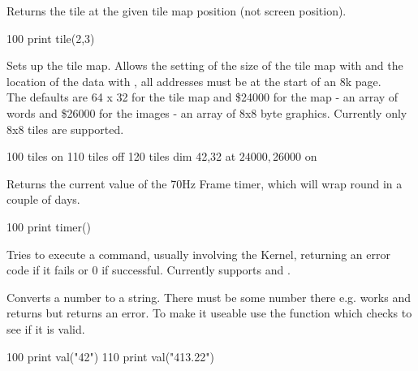 \begin{entry}
Returns the tile at the given tile map position (not screen position).

\begin{lstexample}
100 print tile(2,3)
\end{lstexample}
\end{entry}

\begin{entry}
Sets up the tile map. Allows the setting of the size of the tile map with  and the location of the data with , all addresses must be at the start of an 8k page.\\

The defaults are 64 x 32 for the tile map and \$24000 for the map - an array of words and \$26000 for the images - an array of 8x8 byte graphics. Currently only 8x8 tiles are supported.

\begin{lstexample}
100 tiles on
110 tiles off
120 tiles dim 42,32 at $24000,$26000 on
\end{lstexample}
\end{entry}

\begin{entry}
Returns the current value of the 70Hz Frame timer, which will wrap round in a couple of days.

\begin{lstexample}
100 print timer()
\end{lstexample}
\end{entry}

\begin{entry}
Tries to execute a command, usually involving the Kernel, returning an error code if it fails or 0 if successful. Currently supports  and .

\end{entry}

\begin{entry}
Converts a number to a string. There must be some number there e.g.  works and returns  but  returns an error.  To make it useable use the function  which checks to see if it is valid.

\begin{lstexample}
100 print val("42")
110 print val("413.22")
\end{lstexample}
\end{entry}

